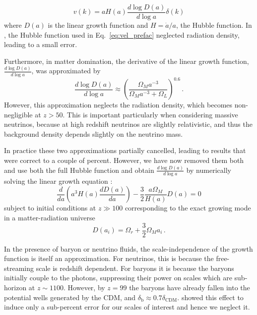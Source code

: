 \documentclass[useAMS, usenatbib]{mnras}
\begin{document}
\begin{equation}
v(k) = a H(a) \frac{d \log D(a)}{d \log a} \delta(k)
\label{eq:vel_prefac}
\end{equation}
where $D(a)$ is the linear growth function and $H = \dot{a}/a$, the Hubble function.
In \cite{AHB}, the Hubble function used in Eq.~\ref{eq:vel_prefac}
neglected radiation density, leading to a small error.

Furthermore, in matter domination, the derivative of the linear growth function,
$\frac{d \log D(a)}{d \log a}$, was approximated by \citep{Bouchet:1995}
\begin{equation}
\frac{d \log D(a)}{d \log a} \approx \left(\frac{\Omega_M a^{-3}}{\Omega_M  a^{-3} + \Omega_L}\right)^{0.6}\,.
\end{equation}
However, this approximation neglects the radiation density, which becomes
non-negligible at $z > 50$. This is important particularly when considering
massive neutrinos, because at high redshift neutrinos are slightly relativistic,
and thus the background density depends slightly on the neutrino mass.

In practice these two approximations partially cancelled, leading
to results that were correct to a couple of percent. However, we
have now removed them both and use both the full Hubble function
and obtain $\frac{d \log D(a)}{d \log a}$ by numerically solving
the linear growth equation \citep{Peebles:1993}:
\begin{equation}
\frac{d}{da}\left(a^3 H(a) \frac{d D(a)}{da}\right) - \frac{3}{2} \frac{a \Omega_M}{H(a)} D(a) = 0
\end{equation}
subject to initial conditions at $z \gg 100$ corresponding
to the exact growing mode in a matter-radiation universe \citep{Groth:1975}
\begin{equation}
  D(a_i) = \Omega_r + \frac{3}{2} \Omega_M a_i\,.
\end{equation}

In the presence of baryon or neutrino fluids, the scale-independence
of the growth function is itself an approximation. For neutrinos, this
is because the free-streaming scale is redshift dependent. For baryons
it is because the baryons initially couple to the photons, suppressing
their power on scales which are sub-horizon at $z \sim 1100$. However,
by $z=99$ the baryons have already fallen into
the potential wells generated by the CDM,
and $\delta_\mathrm{b} \approx 0.7 \delta_\mathrm{CDM}$.
\cite{Zennaro_2017} showed this effect to induce only
a sub-percent error for our scales of interest and hence we neglect it.
\end{document}
